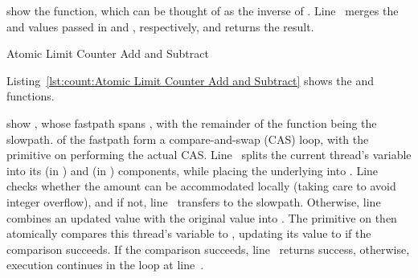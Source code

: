\QuickQuizEnd

\begin{fcvref}
 show the  function, which
can be thought of as the inverse of .
Line~ merges the  and 
values passed in  and , respectively, and returns
the result.
\end{fcvref}

\QuickQuizEnd

\begin{listing}[tbp]

\caption{Atomic Limit Counter Add and Subtract}
\label{lst:count:Atomic Limit Counter Add and Subtract}
\end{listing}

Listing~\ref{lst:count:Atomic Limit Counter Add and Subtract}
shows the  and  functions.

\begin{fcvref}
 show , whose fastpath spans
,
with the remainder of the function being the slowpath.
 of the fastpath form a compare-and-swap
(CAS) loop, with
the  primitive on
 performing the
actual CAS\@.
Line~ splits the current thread's  variable into its
 (in ) and  (in ) components,
while placing the underlying  into .
Line~ checks whether the amount  can be accommodated
locally (taking care to avoid integer overflow), and if not,
line~ transfers to the slowpath.
Otherwise, line~ combines an updated  value with the
original  value into .
The  primitive on
 then atomically
compares this thread's  variable to ,
updating its value to  if the comparison succeeds.
If the comparison succeeds, line~ returns success, otherwise,
execution continues in the loop at line~.
\end{fcvref}

